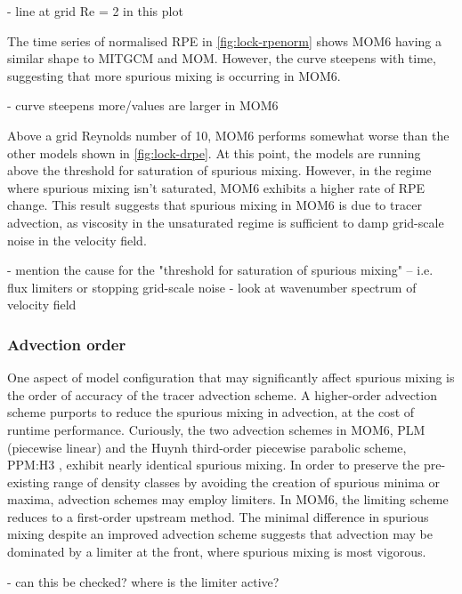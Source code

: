 - line at grid Re = 2 in this plot

The time series of normalised RPE in \cref{fig:lock-rpenorm} shows MOM6 having a similar shape to MITGCM and MOM. However, the curve steepens with time, suggesting that more spurious mixing is occurring in MOM6.

- curve steepens more/values are larger in MOM6

Above a grid Reynolds number of 10, MOM6 performs somewhat worse than the other models shown in \cref{fig:lock-drpe}. At this point, the models are running above the threshold for saturation of spurious mixing. However, in the regime where spurious mixing isn't saturated, MOM6 exhibits a higher rate of RPE change. This result suggests that spurious mixing in MOM6 is due to tracer advection, as viscosity in the unsaturated regime is sufficient to damp grid-scale noise in the velocity field.

- mention the cause for the "threshold for saturation of spurious mixing" -- i.e. flux limiters or stopping grid-scale noise
- look at wavenumber spectrum of velocity field

\subsubsection{Advection order}
One aspect of model configuration that may significantly affect spurious mixing is the order of accuracy of the tracer advection scheme. A higher-order advection scheme purports to reduce the spurious mixing in advection, at the cost of runtime performance. Curiously, the two advection schemes in MOM6, PLM (piecewise linear) and the Huynh third-order piecewise parabolic scheme, PPM:H3 \citep{huynh97}, exhibit nearly identical spurious mixing. In order to preserve the pre-existing range of density classes by avoiding the creation of spurious minima or maxima, advection schemes may employ limiters. In MOM6, the limiting scheme reduces to a first-order upstream method. The minimal difference in spurious mixing despite an improved advection scheme suggests that advection may be dominated by a limiter at the front, where spurious mixing is most vigorous.

- can this be checked? where is the limiter active?

